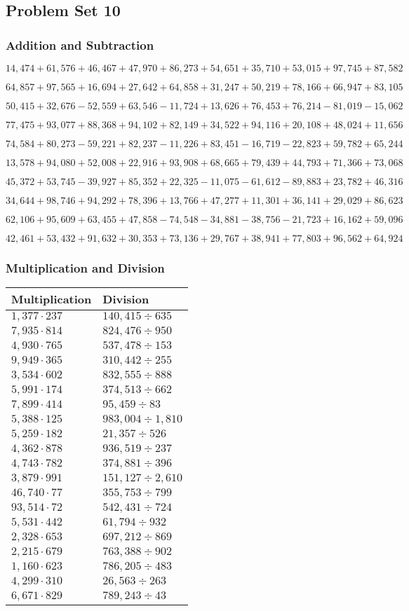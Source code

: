 \hypertarget{problem-set-10-4}{%
\subsection{Problem Set 10}\label{problem-set-10-4}}

\hypertarget{addition-and-subtraction-232}{%
\subsubsection{Addition and
Subtraction}\label{addition-and-subtraction-232}}

\(14,474+61,576+46,467+47,970+86,273+54,651+35,710+53,015+97,745+ 87,582\)

\(64,857+97,565+16,694+27,642+64,858+31,247+50,219+78,166+66,947+83,105\)

\(50,415+32,676-52,559+63,546-11,724+13,626+76,453+76,214-81,019-15,062\)

\(77,475+93,077+88,368+94,102+82,149+34,522+94,116+20,108+48,024+11,656\)

\(74,584+80,273-59,221+82,237-11,226+83,451-16,719-22,823+59,782+65,244\)

\(13,578+94,080+52,008+22,916+93,908+68,665+79,439+44,793+71,366+73,068\)

\(45,372+53,745-39,927+85,352+22,325-11,075-61,612-89,883+23,782+46,316\)

\(34,644+98,746+94,292+78,396+13,766+47,277+11,301+36,141+29,029+86,623\)

\(62,106+95,609+63,455+47,858-74,548-34,881-38,756-21,723+16,162+59,096\)

\(42,461+53,432+91,632+30,353+73,136+29,767+38,941+77,803+96,562+64,924\)

\hypertarget{multiplication-and-division-231}{%
\subsubsection{Multiplication and
Division}\label{multiplication-and-division-231}}

\begin{longtable}[]{@{}ll@{}}
\toprule
Multiplication & Division\tabularnewline
\midrule
\endhead
\(1,377\cdot237\) & \(140,415÷635\)\tabularnewline
\(7,935\cdot814\) & \(824,476÷950\)\tabularnewline
\(4,930\cdot765\) & \(537,478÷153\)\tabularnewline
\(9,949\cdot365\) & \(310,442÷255\)\tabularnewline
\(3,534\cdot602\) & \(832,555÷888\)\tabularnewline
\(5,991\cdot174\) & \(374,513÷662\)\tabularnewline
\(7,899\cdot414\) & \(95,459÷83\)\tabularnewline
\(5,388\cdot125\) & \(983,004÷1,810\)\tabularnewline
\(5,259\cdot182\) & \(21,357÷526\)\tabularnewline
\(4,362\cdot878\) & \(936,519÷237\)\tabularnewline
\(4,743\cdot782\) & \(374,881÷396\)\tabularnewline
\(3,879\cdot991\) & \(151,127÷2,610\)\tabularnewline
\(46,740\cdot77\) & \(355,753÷799\)\tabularnewline
\(93,514\cdot72\) & \(542,431÷724\)\tabularnewline
\(5,531\cdot442\) & \(61,794÷932\)\tabularnewline
\(2,328\cdot653\) & \(697,212÷869\)\tabularnewline
\(2,215\cdot679\) & \(763,388÷902\)\tabularnewline
\(1,160\cdot623\) & \(786,205÷483\)\tabularnewline
\(4,299\cdot310\) & \(26,563÷263\)\tabularnewline
\(6,671\cdot829\) & \(789,243÷43\)\tabularnewline
\bottomrule
\end{longtable}

